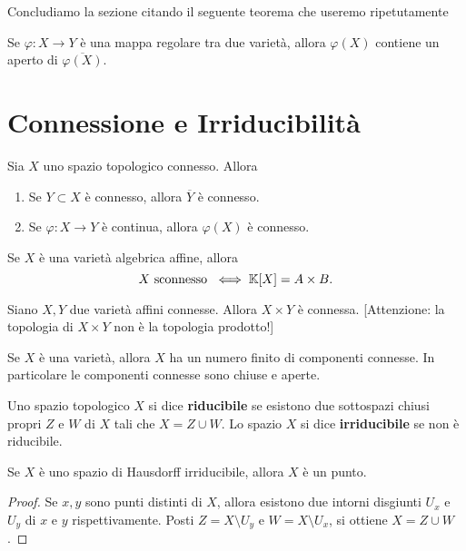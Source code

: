 Concludiamo la sezione citando il seguente teorema che useremo ripetutamente

\begin{theorem}[Chevalley]\label{ThChevalley}
    Se $\varphi\colon X \to Y$ è una mappa regolare tra due varietà, allora $\varphi(X)$ contiene un aperto di $\overline{\varphi(X)}$.
\end{theorem}

\section{Connessione e Irriducibilit\`a}
Sia $X$ uno spazio topologico connesso. Allora
\begin{enumerate}
    \item Se $Y\subset X$ è connesso, allora $\overline{Y}$ è connesso.
    \item Se $\varphi\colon X \to Y$ è continua, allora $\varphi(X)$ è connesso.
\end{enumerate}

\begin{exercise}
    Se $X$ è una varietà algebrica affine, allora \[X \text{ sconnesso } \iff \mathbb{K}[X]=A\times B.\]
\end{exercise}

\begin{exercise}
    Siano $X,Y$ due varietà affini connesse. Allora $X\times Y$ è connessa. [Attenzione: la topologia di $X\times Y$ non è la topologia prodotto!]
\end{exercise}

\begin{exercise}
    Se $X$ è una varietà, allora $X$ ha un numero finito di componenti connesse. In particolare le componenti connesse sono chiuse e aperte.
\end{exercise}

\begin{definition}
    Uno spazio topologico $X$ si dice \textbf{riducibile} se esistono due sottospazi chiusi propri $Z$ e $W$ di $X$ tali che $X=Z\cup W$. Lo spazio $X$ si dice \textbf{irriducibile} se non è riducibile.
\end{definition}

\begin{remark}
    Se $X$ è uno spazio di Hausdorff irriducibile, allora $X$ è un punto.
\end{remark}
\begin{proof}
    Se $x,y$ sono punti distinti di $X$, allora esistono due intorni disgiunti $U_x$ e $U_y$ di $x$ e $y$ rispettivamente. Posti $Z=X\setminus U_y$ e $W=X\setminus U_x$, si ottiene $X=Z\cup W$.
\end{proof}

